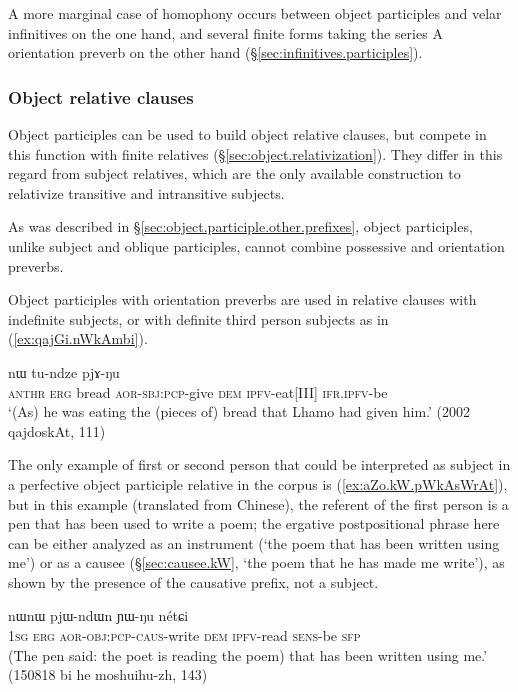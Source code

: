 A more marginal case of homophony occurs between object participles  and velar infinitives on the one hand, and several finite forms taking the series A orientation preverb  on the other hand (§\ref{sec:infinitives.participles}).
 
\subsubsection{Object relative clauses} \label{sec:object.participle.relatives} 
Object participles can be used to build object relative clauses, but compete in this function with finite relatives (§\ref{sec:object.relativization}). They differ in this regard from subject relatives, which are the only available construction to relativize transitive and intransitive subjects.


As was described in §\ref{sec:object.participle.other.prefixes}, object participles, unlike subject and oblique participles, cannot combine possessive and orientation preverbs.

Object participles with orientation preverbs are used in relative clauses with indefinite subjects, or with definite third person subjects as in (\ref{ex:qajGi.nWkAmbi}).  
 
\begin{exe}
\ex \label{ex:qajGi.nWkAmbi}
 nɯ tu-ndze pjɤ-ŋu \\
\textsc{anthr} \textsc{erg} bread \textsc{aor}-\textsc{sbj}:\textsc{pcp}-give \textsc{dem} \textsc{ipfv}-eat[III] \textsc{ifr}.\textsc{ipfv}-be \\
\glt `(As) he was eating the (pieces of) bread that Lhamo had given him.' (2002 qajdoskAt, 111)
\end{exe}  

The only example of first or second person that could be interpreted as subject in a perfective object participle relative in the corpus is (\ref{ex:aZo.kW.pWkAsWrAt}), but in this example (translated from Chinese), the referent of the first person is a pen that has been used to write a poem; the ergative postpositional phrase  here can be either analyzed as an instrument (`the poem that has been written using me') or as a causee  (§\ref{sec:causee.kW}, `the poem that he has made me write'), as shown by the presence of the causative  prefix, not a subject.

\begin{exe}
\ex \label{ex:aZo.kW.pWkAsWrAt}
 nɯnɯ pjɯ-ndɯn ɲɯ-ŋu nétɕi \\
\textsc{1sg} \textsc{erg} \textsc{aor}-\textsc{obj}:\textsc{pcp}-\textsc{caus}-write \textsc{dem} \textsc{ipfv}-read \textsc{sens}-be \textsc{sfp} \\
\glt (The pen said: the poet is reading the poem) that has been written using me.' (150818 bi he moshuihu-zh, 143)
\end{exe}  

